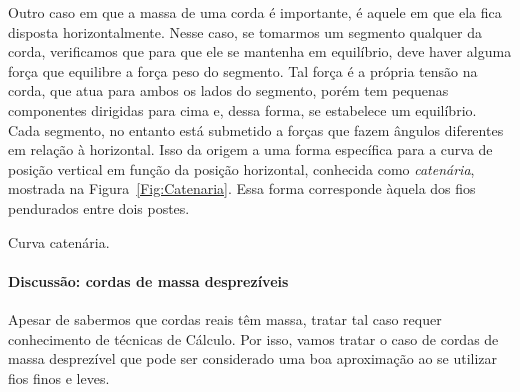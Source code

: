 Outro caso em que a massa de uma corda é importante, é aquele em que ela fica disposta horizontalmente. Nesse caso, se tomarmos um segmento qualquer da corda, verificamos que para que ele se mantenha em equilíbrio, deve haver alguma força que equilibre a força peso do segmento. Tal força é a própria tensão na corda, que atua para ambos os lados do segmento, porém tem pequenas componentes dirigidas para cima e, dessa forma, se estabelece um equilíbrio. Cada segmento, no entanto está submetido a forças que fazem ângulos diferentes em relação à horizontal. Isso da origem a uma forma específica para a curva de posição vertical em função da posição horizontal, conhecida como \emph{catenária}, mostrada na Figura~\ref{Fig:Catenaria}. Essa forma corresponde àquela dos fios pendurados entre dois postes.

\begin{marginfigure}[-3cm]
\centering
{}
\caption{Curva catenária.\label{Fig:Catenaria}}
\end{marginfigure}

\paragraph{Discussão: cordas de massa desprezíveis}

Apesar de sabermos que cordas reais têm massa, tratar tal caso requer conhecimento de técnicas de Cálculo. Por isso, vamos tratar o caso de cordas de massa desprezível que pode ser considerado uma boa aproximação ao se utilizar fios finos e leves.

